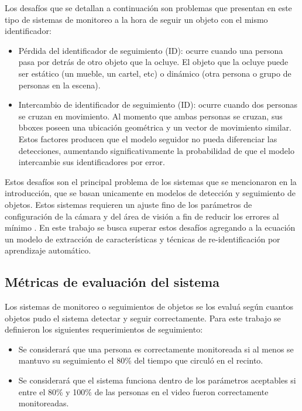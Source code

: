 \documentclass[a4paper]{IEEEtran}
\begin{document}
Los desafíos que se detallan a continuación son problemas que presentan en este tipo de sistemas de monitoreo a la hora de seguir un objeto con el mismo identificador:
\begin{itemize}
\item Pérdida del identificador de seguimiento (ID): ocurre cuando una persona pasa por detrás de otro objeto que la ocluye. El objeto que la ocluye puede ser estático (un mueble, un cartel, etc) o dinámico (otra persona o grupo de personas en la escena).
\item Intercambio de identificador de seguimiento (ID): ocurre cuando dos personas se cruzan en movimiento. Al momento que ambas personas se cruzan, sus bboxes poseen una ubicación geométrica y un vector de movimiento similar. Estos factores producen que el modelo seguidor no pueda diferenciar las detecciones, aumentando significativamente la probabilidad de que el modelo intercambie sus identificadores por error.
\end{itemize}

Estos desafíos son el principal problema de los sistemas que se mencionaron en la introducción, que se basan unicamente en modelos de detección y seguimiento de objetos. Estos sistemas requieren un ajuste fino de los parámetros de configuración de la cámara y del área de visión a fin de reducir los errores al mínimo \cite{b14}. En este trabajo se busca superar estos desafíos agregando a la ecuación un modelo de extracción de características y técnicas de re-identificación por aprendizaje automático.

\subsection{Métricas de evaluación del sistema}

Los sistemas de monitoreo o seguimientos de objetos se los evaluá según cuantos objetos pudo el sistema detectar y seguir correctamente. Para este trabajo se definieron los siguientes requerimientos de seguimiento:

\begin{itemize}
\item Se considerará que una persona es correctamente monitoreada si al menos se mantuvo su seguimiento el 80\% del tiempo que circuló en el
recinto.
\item Se considerará que el sistema funciona dentro de los parámetros aceptables si entre el 80\% y 100\% de las personas en el video fueron correctamente monitoreadas.
\end{itemize}
\end{document}
